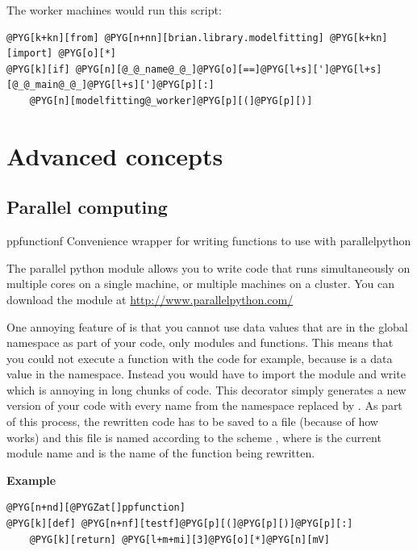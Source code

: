 \documentclass[letterpaper,10pt,english]{manual}
\begin{document}
The worker machines would run this script:

\begin{Verbatim}[commandchars=@\[\]]
@PYG[k+kn][from] @PYG[n+nn][brian.library.modelfitting] @PYG[k+kn][import] @PYG[o][*]
@PYG[k][if] @PYG[n][@_@_name@_@_]@PYG[o][==]@PYG[l+s][']@PYG[l+s][@_@_main@_@_]@PYG[l+s][']@PYG[p][:]
    @PYG[n][modelfitting@_worker]@PYG[p][(]@PYG[p][)]
\end{Verbatim}

\resetcurrentobjects
\hypertarget{--doc-advanced}{}

\chapter{Advanced concepts}

\resetcurrentobjects
\hypertarget{--doc-parallel}{}

\hypertarget{index-82}{}\section{Parallel computing}

\hypertarget{brian.ppfunction}{}\begin{funcdesc}{ppfunction}{f}
Convenience wrapper for writing functions to use with parallelpython

The parallel python module  allows you to write code that runs simultaneously
on multiple cores on a single machine, or multiple machines on a cluster. You can
download the module at \href{http://www.parallelpython.com/}{http://www.parallelpython.com/}

One annoying feature of  is that you cannot use data values that are in the
global namespace as part of your code, only modules and functions. This means that
you could not execute a function with the code  for example, because 
is a data value in the  namespace. Instead you would have to import
the  module and write  which is annoying in long chunks
of code. This decorator simply generates a new version of your code with every
name  from the  namespace replaced by . As part of this
process, the rewritten code has to be saved to a file (because of how  works)
and this file is named according to the scheme
, where  is the current
module name and  is the name of the function being rewritten.

\textbf{Example}

\begin{Verbatim}[commandchars=@\[\]]
@PYG[n+nd][@PYGZat[]ppfunction]
@PYG[k][def] @PYG[n+nf][testf]@PYG[p][(]@PYG[p][)]@PYG[p][:]
    @PYG[k][return] @PYG[l+m+mi][3]@PYG[o][*]@PYG[n][mV]
\end{Verbatim}
\end{funcdesc}
\end{document}
